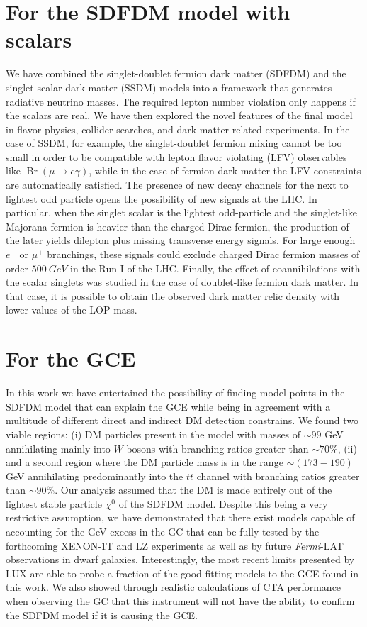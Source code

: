 \section{For the SDFDM model with scalars}
We have combined the singlet-doublet fermion dark matter (SDFDM) and
the singlet scalar dark matter (SSDM) models into a framework that generates radiative neutrino masses. 
The required lepton number violation only happens if the scalars are
real.   
We have then explored the novel features of the final model in flavor
physics, collider searches, and dark matter related experiments.  
In the case of SSDM, for example, the singlet-doublet fermion mixing
cannot be too small in order to be compatible with lepton flavor
violating (LFV) observables like $\operatorname{Br}(\mu\to e\gamma)$,
while in the case of fermion dark matter the LFV constraints are
automatically satisfied.
The presence of new decay channels for the next to lightest odd
particle opens the possibility of new signals at the LHC.
In particular, when the singlet scalar is the lightest
odd-particle and the singlet-like Majorana fermion is heavier than the
charged Dirac fermion, the production of the later yields dilepton plus missing transverse energy signals. For large enough
$e^\pm$ or $\mu^\pm$ branchings, these signals could exclude charged
Dirac fermion masses
of order $\SI{500}{GeV}$ in the Run I of the LHC. 
Finally, the effect of coannihilations with the scalar singlets was
studied in the case of doublet-like fermion dark matter.  In that
case, it is possible to obtain the observed dark matter relic density
with lower values of the LOP mass.


\section{For the GCE}
In this work we have entertained the possibility of finding model points in the SDFDM model that can explain the GCE while being in agreement with a multitude of different direct and indirect DM detection constrains. We found two viable regions: (i) DM particles present in the model with masses of $\sim 99$ GeV annihilating mainly into $W$ bosons with branching ratios greater than $\sim 70\%$, (ii) and a second region where the DM particle mass is in the range $\sim (173-190)$ GeV annihilating predominantly into the $t\bar{t}$ channel with branching ratios greater than $\sim 90\%$. Our analysis assumed that the DM is made entirely out of the lightest stable particle $\chi^0$ of the SDFDM model. Despite this being a very restrictive assumption, we have demonstrated that there exist models capable of accounting for the GeV excess in the GC that can be fully tested by the forthcoming XENON-1T and LZ experiments as well as by future \textit{Fermi}-LAT observations in dwarf galaxies. Interestingly, the most recent limits presented by LUX are able to probe a fraction of the good fitting models to the GCE found in this work. We also showed through realistic calculations of CTA performance when observing the GC that this instrument will not have the ability to confirm the SDFDM model if it is causing the GCE.